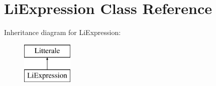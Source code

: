 \hypertarget{class_li_expression}{}\section{Li\+Expression Class Reference}
\label{class_li_expression}
Inheritance diagram for Li\+Expression\+:\begin{figure}[H]
\begin{center}
\leavevmode
\includegraphics[height=2.000000cm]{class_li_expression}
\end{center}
\end{figure}
